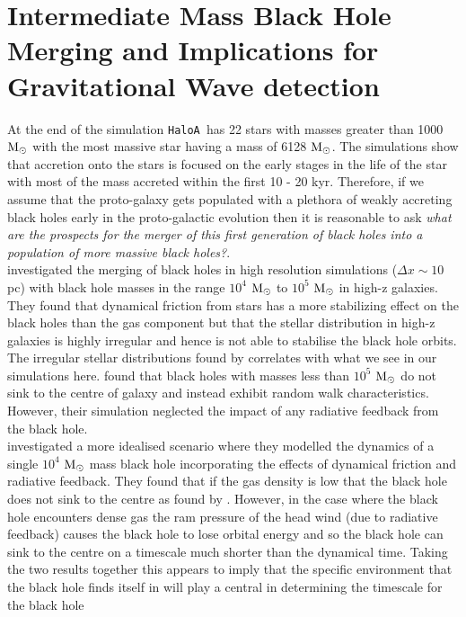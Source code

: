 \documentclass[graphics, twocolumn, usenatbib]{mn2e}
\newcommand{\msolar} {$\rm{M_{\odot}}~$}
\newcommand{\msolarc} {$\rm{M_{\odot}}$}
\newcommand{\ha} {\texttt{HaloA~}}
\begin{document}
\section{Intermediate Mass Black Hole Merging and Implications for Gravitational Wave detection} \label{Sec:Discussion}
At the end of the simulation \ha has 22 stars with masses greater than 1000 \msolar with the most
massive star having a mass of 6128 \msolarc. The simulations show that accretion onto the stars is
focused on the early stages in the life of the star with most of the mass accreted within the
first 10 - 20 kyr. Therefore, if we assume that the proto-galaxy gets populated with a plethora of
weakly accreting black holes early in the proto-galactic evolution then it is reasonable to ask \textit{what are the prospects for the merger of this first generation
  of black holes into a population of more massive black holes?}.\\
\indent \cite{Pfister_2019} investigated the merging of black holes in high resolution
simulations ($\Delta x \sim 10$ pc) with black hole masses in the range
$10^4$ \msolar to $10^5$ \msolar in high-z galaxies. They found that dynamical friction from stars
has a more stabilizing effect on the black holes than the gas component but that the stellar
distribution in high-z galaxies is highly irregular and hence is not able to stabilise the black
hole orbits. The irregular stellar distributions found by \cite{Pfister_2019} correlates with what
we see in our simulations here. \cite{Pfister_2019} found that black holes with masses less than
$10^5$ \msolar do not sink to the centre of galaxy and instead exhibit random walk characteristics.
However, their simulation neglected the impact of any radiative feedback from the black hole.\\
\indent \cite{Toyouchi_2020} investigated a more idealised scenario where they modelled the
dynamics of a single $10^4$ \msolar mass black hole incorporating the effects of dynamical friction
and radiative feedback. They found that if the gas density is low that the black hole
does not sink to the centre as found by \cite{Pfister_2019}. However, in the case where
the black hole encounters dense gas the ram pressure of the head wind (due to radiative feedback)
causes the black hole to lose orbital energy and so the black hole can sink to the centre on a
timescale much shorter than the dynamical time. Taking the two results together this
appears to imply that the specific environment that the black hole finds
itself in will play a central in determining the timescale for the black hole
\end{document}
